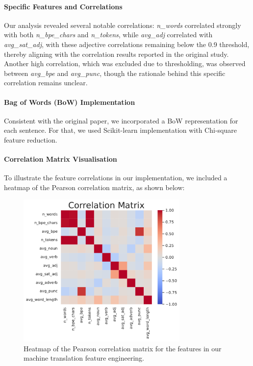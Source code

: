 \paragraph{Specific Features and Correlations}
Our analysis revealed several notable correlations: \textit{n\_words} correlated strongly with both \textit{n\_bpe\_chars} and \textit{n\_tokens}, while \textit{avg\_adj} correlated with \textit{avg\_sat\_adj}, with these adjective correlations remaining below the 0.9 threshold, thereby aligning with the correlation results reported in the original study. Another high correlation, which was excluded due to thresholding, was observed between \textit{avg\_bpe} and \textit{avg\_punc}, though the rationale behind this specific correlation remains unclear.

\paragraph{Bag of Words (BoW) Implementation}
Consistent with the original paper, we incorporated a BoW representation for each sentence. For that, we used Scikit-learn implementation with Chi-square feature reduction.

\paragraph{Correlation Matrix Visualisation}
To illustrate the feature correlations in our implementation, we included a heatmap of the Pearson correlation matrix, as shown below:

\begin{figure}[h]
  \centering
  \includegraphics[width=0.75\textwidth]{figures/text_corr_matrix.pdf}
  \caption{Heatmap of the Pearson correlation matrix for the features in our machine translation feature engineering.}
  \label{fig:nlp_correlation_matrix}
\end{figure}

